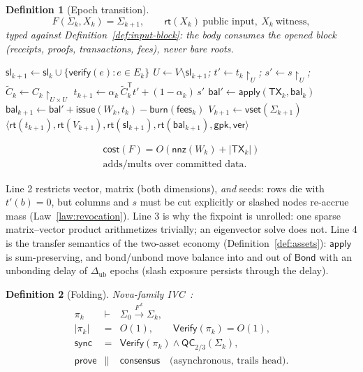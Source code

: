 \documentclass[11pt,letterpaper]{article}
\newtheorem{definition}{Definition}
\begin{document}
\begin{definition}[Epoch transition]\label{def:step}
\[
F(\Sigma_k,X_k)=\Sigma_{k+1},\qquad
\mathsf{rt}(X_k)\ \text{public input},\ X_k\ \text{witness},
\]
typed against Definition~\ref{def:input-block}: the body consumes the
opened block (receipts, proofs, transactions, fees), never bare roots.
\begin{algorithm}[H]
\caption{$F$ --- pure, deterministic, per epoch}
\label{alg:step}
\begin{algorithmic}[1]
\State $\mathsf{sl}_{k+1}\gets\mathsf{sl}_k\cup
  \{\mathsf{verify}(e):e\in E_k\}$
\State $U\gets V\setminus\mathsf{sl}_{k+1}$;\quad
  $t'\gets t_k\restriction_{U}$;\quad
  $s'\gets s\restriction_{U}$;\quad
  $\tilde C_k\gets C_k\restriction_{U\times U}$
\State $t_{k+1}\gets\alpha_k\,\tilde C_k^{\mathsf T}t'+(1-\alpha_k)\,s'$
\State $\mathsf{bal}'\gets\mathsf{apply}(\mathsf{TX}_k,\mathsf{bal}_k)$
\State $\mathsf{bal}_{k+1}\gets\mathsf{bal}'+
  \mathsf{issue}(W_k,t_k)-\mathsf{burn}(\mathsf{fees}_k)$
\State $V_{k+1}\gets\mathsf{vset}(\Sigma_{k+1})$
\State \Return
  $\langle\mathsf{rt}(t_{k+1}),\mathsf{rt}(V_{k+1}),
  \mathsf{rt}(\mathsf{sl}_{k+1}),\mathsf{rt}(\mathsf{bal}_{k+1}),
  \mathsf{gpk},\mathsf{ver}\rangle$
\end{algorithmic}
\end{algorithm}
\[
\begin{array}{c}
\mathsf{cost}(F)=O(\mathsf{nnz}(W_k)+|\mathsf{TX}_k|)\\
\text{adds/mults over committed data}.
\end{array}
\]
\end{definition}

Line 2 restricts vector, matrix (both dimensions), \emph{and} seeds:
rows die with $t'(b)=0$, but columns and $s$ must be cut explicitly or
slashed nodes re-accrue mass (Law~\ref{law:revocation}).  Line 3 is why
the fixpoint is unrolled: one sparse matrix--vector product
arithmetizes trivially; an eigenvector solve does not.  Line 4 is the
transfer semantics of the two-asset economy
(Definition~\ref{def:assets}): $\mathsf{apply}$ is sum-preserving, and
bond/unbond move balance into and out of $\mathsf{Bond}$ with an
unbonding delay of $\Delta_{\mathrm{ub}}$ epochs (slash exposure
persists through the delay).

\begin{definition}[Folding]\label{def:fold}
Nova-family IVC~\cite{Nova}:
\[
\begin{array}{rcl}
\pi_k&\vdash&\Sigma_0\xrightarrow{F^{\,k}}\Sigma_k,\\
|\pi_k|&=&O(1),\qquad
\mathsf{Verify}(\pi_k)=O(1),\\
\mathsf{sync}&=&
  \mathsf{Verify}(\pi_k)\land\mathsf{QC}_{2/3}(\Sigma_k),\\
\mathsf{prove}&\parallel&\mathsf{consensus}
  \quad\text{(asynchronous, trails head)}.
\end{array}
\]
\end{definition}
\end{document}

